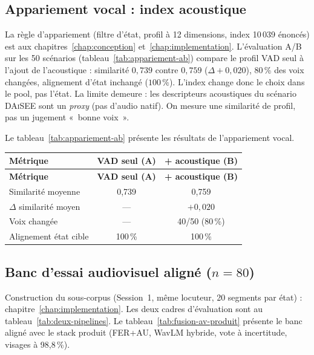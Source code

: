\subsection{Appariement vocal : index acoustique}
\label{subsec:val-appariement}

La règle d'appariement (filtre d'état, profil à 12 dimensions, index
10\,039 énoncés) est aux chapitres~\ref{chap:conception}
et~\ref{chap:implementation}. L'évaluation A/B sur les 50 scénarios
(tableau~\ref{tab:appariement-ab}) compare le profil VAD seul à l'ajout
de l'acoustique : similarité $0{,}739$ contre $0{,}759$
($\Delta +0{,}020$), 80\,\% des voix changées, alignement d'état inchangé
($100\,\%$). L'index change donc le choix dans le pool, pas l'état. La
limite demeure : les descripteurs acoustiques du scénario \textsc{DAiSEE}
sont un \emph{proxy} (pas d'audio natif). On mesure une similarité de
profil, pas un jugement «~bonne voix~».

Le tableau~\ref{tab:appariement-ab} présente les résultats de l'appariement vocal.

{\small
\renewcommand{\arraystretch}{1.18}
\setlength{\tabcolsep}{4pt}
\begin{xltabular}{\textwidth}{|>{\raggedright\arraybackslash}X|c|c|}
\hline
{}
\textbf{Métrique} & \textbf{VAD seul (A)} & \textbf{+ acoustique (B)} \\
\hline
\endfirsthead
\hline
{}
\textbf{Métrique} & \textbf{VAD seul (A)} & \textbf{+ acoustique (B)} \\
\hline
\endhead
\endfoot
\endlastfoot
Similarité moyenne & 0{,}739 & 0{,}759 \\
\hline
$\Delta$ similarité moyen & --- & $+0{,}020$ \\
\hline
Voix changée & --- & 40/50 (80\,\%) \\
\hline
Alignement état cible & 100\,\% & 100\,\% \\
\hline
\end{xltabular}
\label{tab:appariement-ab}
}

\subsection{Banc d'essai audiovisuel aligné ($n=80$)}
\label{subsec:val-banc}

Construction du sous-corpus (Session~1, même locuteur, 20 segments par
état) : chapitre~\ref{chap:implementation}. Les deux cadres d'évaluation
sont au tableau~\ref{tab:deux-pipelines}. Le tableau~\ref{tab:fusion-av-produit}
présente le banc aligné avec le stack produit (FER+AU, WavLM hybride, vote à
incertitude, visages à 98{,}8\,\%).

